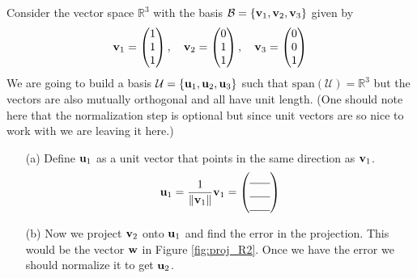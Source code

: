 \begin{problem}
    Consider the vector space $\mathbb{R}^3$ with the basis $\mathcal{B} = \{{\bf v}_1, {\bf v}_2,
    {\bf v}_3\}$ given by
    \[ {\bf v}_1 = \begin{pmatrix} 1\\1\\1\end{pmatrix}, \quad {\bf v}_2 = \begin{pmatrix} 0
            \\1\\1\end{pmatrix},\quad {\bf v}_3 = \begin{pmatrix} 0\\0\\1\end{pmatrix} \]
                We are going to build a basis $\mathcal{U} = \{{\bf u}_1, {\bf u}_2, {\bf u}_3\}$ such that $\text{span}(\mathcal{U}) =
    \mathbb{R}^3$ but the vectors are also mutually orthogonal and all have unit length.
    (One should note here that the normalization step is optional but since unit vectors
    are so nice to work with we are leaving it here.)
    \begin{enumerate}
        \item[(a)] Define ${\bf u}_1$ as a unit vector that points in the same direction as
            ${\bf v}_1$.
            \[ {\bf u}_1 = \frac{1}{\|{\bf v}_1\|} {\bf v}_1 =  \begin{pmatrix} \underline{\hspace{0.25in}} \\
                    \underline{\hspace{0.25in}} \\ \underline{\hspace{0.25in}} \end{pmatrix}
                    \]
        \item[(b)] Now we project ${\bf v}_2$ onto ${\bf u}_1$ and find the error in the
            projection.  This would be the vector ${\bf w}$ in Figure \ref{fig:proj_R2}.  Once
            we have the error we should normalize it to get ${\bf u}_2$.

\end{enumerate}
\end{problem}
